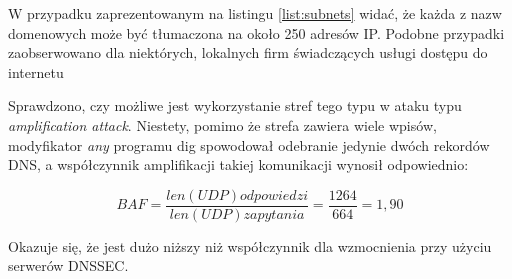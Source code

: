 W przypadku zaprezentowanym na listingu \ref{list:subnets} widać, że każda z nazw domenowych może być tłumaczona na około 250 adresów
IP. Podobne przypadki zaobserwowano dla niektórych, lokalnych firm świadczących usługi dostępu do internetu

Sprawdzono, czy możliwe jest wykorzystanie stref tego typu w ataku typu \textit{amplification attack}. Niestety, pomimo że strefa
zawiera wiele wpisów, modyfikator \textit{any} programu dig spowodował odebranie jedynie dwóch rekordów DNS, a współczynnik
amplifikacji takiej komunikacji wynosił odpowiednio:

$$ BAF=\frac{len(UDP) odpowiedzi}{len(UDP) zapytania}=\frac{1264}{664}=1,90 $$

Okazuje się, że jest dużo niższy niż współczynnik dla wzmocnienia przy użyciu serwerów DNSSEC.
